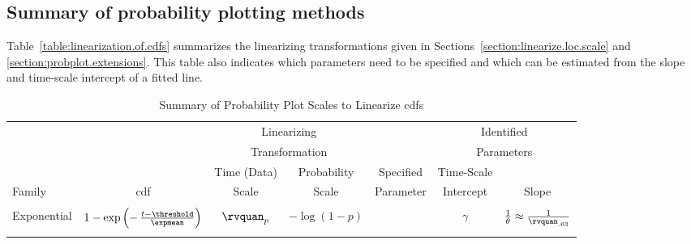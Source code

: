 \subsection{Summary of probability plotting methods}
Table~\ref{table:linearization.of.cdfs}
summarizes the linearizing transformations
given in Sections~\ref{section:linearize.loc.scale}
and \ref{section:probplot.extensions}.
This table also indicates which parameters need to be specified
and which can be estimated from the
slope and time-scale intercept of a fitted line.
\begin{sidewaystable}
\caption{Summary of Probability Plot Scales to
Linearize cdfs}
\centering\small
\begin{tabular}{lrcrccc}
\\[-.5ex]
\hline
& & 
\multicolumn{2}{c}{Linearizing}&& \multicolumn{2}{c}{Identified}
\\
& & 
\multicolumn{2}{c}{Transformation}& & \multicolumn{2}{c}{Parameters}
\\
\cline{3-4}  \cline{6-7}
       &                               & \multicolumn{1}{c}{Time (Data)}          &
\multicolumn{1}{c}{Probability}&Specified&\multicolumn{1}{c}{Time-Scale}
\\
Family &\multicolumn{1}{c}{cdf}  &  \multicolumn{1}{c}{Scale}
& \multicolumn{1}{c}{Scale}&Parameter& Intercept&Slope \\
\hline
\\
Exponential & $1-\exp \left (-\,  \frac{t-\threshold}{\expmean}\right )$ & $\rvquan_{p}$
& $-\log(1-p)$ &   & $\gamma$  & $\frac{1}{\theta} 
\approx \frac{1}{\rvquan_{.63}}$  \\ \\
%


\end{tabular}
\end{sidewaystable}

